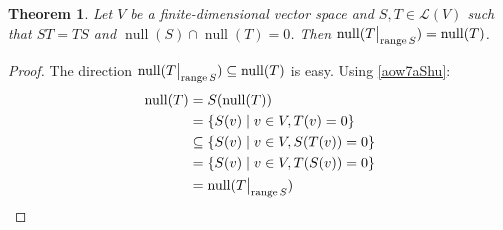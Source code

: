 \documentclass{article}
\DeclareMathOperator{\nullspace}{null}
\DeclareMathOperator{\range}{range}
\newcommand\restr[2]{{\left.\kern-\nulldelimiterspace #1 \vphantom{\big|} \right|_{#2}}}
\theoremstyle{plain}\newtheorem{theorem}{Theorem}
\theoremstyle{plain}\newtheorem{proposition}{Proposition}
\theoremstyle{remark}\newtheorem{remark}{Remark}
\begin{document}
\begin{theorem}\label{fahch9Wu}
    Let $V$ be a finite-dimensional vector space and $S, T \in \mathcal{L}(V)$ such that $S T = T S$ and $\nullspace(S) \cap \nullspace(T) = 0$. Then $\nullspace(\restr{T}{\range{S}}) = \nullspace(T)$.
\end{theorem}
\begin{proof}
    The direction $\nullspace(\restr{T}{\range{S}}) \subseteq \nullspace(T)$ is easy. Using \autoref{aow7aShu}:
    \begin{equation*}
        \begin{aligned}
            \nullspace(T) & = S (\nullspace(T))                            \\
                          & = \{ S(v) \mid v \in V, T(v) = 0 \}            \\
                          & \subseteq \{ S(v) \mid v \in V, S(T(v)) = 0 \} \\
                          & = \{ S(v) \mid v \in V, T(S(v)) = 0 \}         \\
                          & = \nullspace(\restr{T}{\range{S}})             \\
        \end{aligned}
    \end{equation*}
\end{proof}
\end{document}
